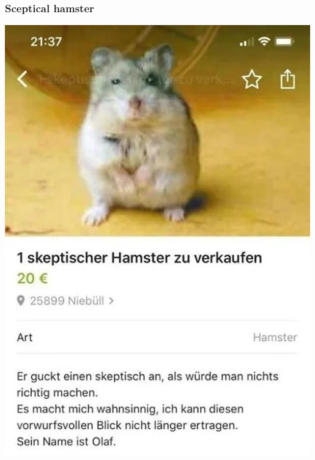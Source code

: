\documentclass[svgnames]{beamer}
\begin{document}
\begin{frame}
  \frametitle{Sceptical hamster}
  \centering
  \includegraphics[height=.8\textheight]{sceptical-hamster}
\end{frame}
\end{document}
